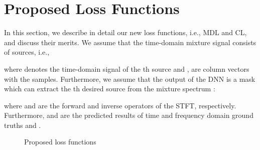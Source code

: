\documentclass{article}
\begin{document}
\vspace{-1mm}
\section{Proposed Loss Functions}
\label{sec:propose}
\vspace{-1mm}
In this section, we describe in detail our new loss functions, i.e., MDL and CL, and discuss their merits.
We assume that the time-domain mixture signal  consists of  sources, i.e.,
 
where  denotes the time-domain signal of the th source and ,  are column vectors with the samples.
Furthermore, we assume that the output of the DNN is a mask  which can extract the th desired source from the mixture spectrum :
 
where  and  are the forward and inverse operators of the STFT, respectively.
Furthermore,  and  are the predicted results of time and frequency domain ground truths  and .

\begin{figure*}[t]
\centering
{}
\hspace{+2mm}


\caption{Proposed loss functions}
  \label{fig:overview}
\end{figure*}
\fi

\vspace{-1mm}
\end{document}
